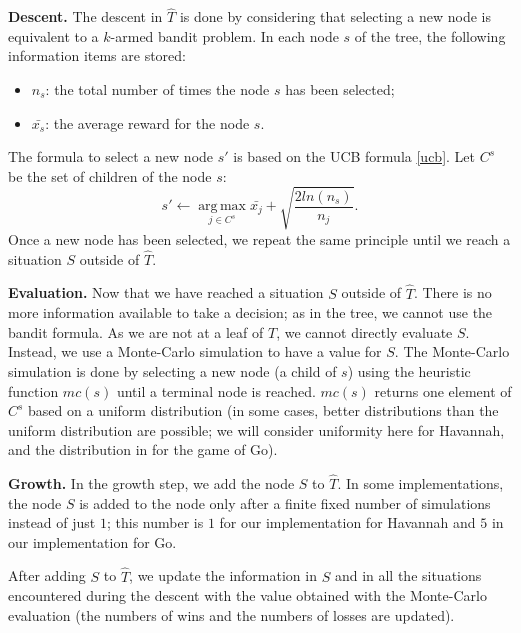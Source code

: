 \documentclass{llncs}
\begin{document}
{\bf{Descent.}} The descent in $\hat{T}$ is done by considering that selecting a new node is equivalent to a $k$-armed bandit problem. In each node $s$ of the tree, the following information items are stored:
\begin{itemize}
\item $n_s$: the total number of times the node $s$ has been selected;
\item $\bar{x_s}$: the average reward for the node $s$.
\end{itemize}
The formula to select a new node $s'$ is based on the UCB formula \ref{ucb}.
Let $C^s$ be the set of children of the node $s$:
$$ s' \leftarrow  \operatorname*{arg\,max}\limits_{j \in C^s}{\bar{x_j} + \sqrt{\frac{2ln(n_{s})}{n_j}}}. $$
Once a new node has been selected, we repeat the same principle until we reach a situation $S$ outside of $\hat{T}$.

{\bf{Evaluation.}}
Now that we have reached a situation $S$ outside of $\hat{T}$. There is no more information available to take a decision; as in the tree, we cannot use the bandit formula. As we are not at a leaf of $T$, we cannot directly evaluate $S$. Instead, we use a Monte-Carlo simulation to have a value for $S$. The Monte-Carlo simulation is done by selecting a new node (a child of $s$) using the heuristic function $mc(s)$ until a terminal node is reached.
$mc(s)$ returns one element of $C^s$ based on a uniform distribution (in some cases, better distributions than the uniform distribution are possible; we will consider uniformity here for Havannah, and the distribution in \cite{mogofpu} for the game of Go).  
 

{\bf{Growth.}}
In the growth step, we add the node $S$ to $\hat{T}$. In some implementations, the node $S$ is added to the node only after a finite fixed number of simulations instead of just $1$; this number is $1$ for our implementation for Havannah and $5$ in our implementation for Go.  

After adding $S$ to $\hat T$, we update the information in $S$ and in all the situations encountered during the descent with the value obtained with the Monte-Carlo evaluation (the numbers of wins and the numbers of losses are updated).
\end{document}
